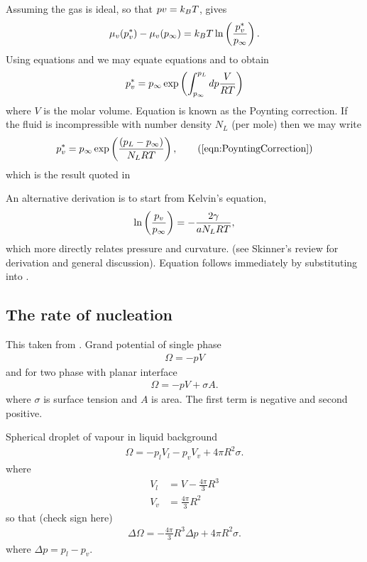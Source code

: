 Assuming the gas is ideal, so that $ p v = k_B T$,  gives
\begin{align}
  \mu_v(p_v^\ast) - \mu_v(p_{\infty}) = k_B T \ln \left( \frac{p_v^\ast}{p_\infty} \right).
\end{align}
Using equations  and  we may
equate equations  and  to obtain
\begin{align}
  p_v^\ast = p_\infty \exp \left( \int_{p_\infty}^{p_L} dp\frac{V}{RT}   \right)\label{eqn:PoyntingCorrectionFormal}
\end{align}
where $V$ is the molar volume.
Equation  is known as the Poynting correction.
If the fluid is incompressible with number density $N_L$  (per mole) then we may write
\begin{align}
  p_v^\ast = p_\infty \exp \lr{ \frac{\lr{p_L -p_\infty} }{N_L RT}  },\tag{\ref{eqn:PoyntingCorrection}}
\end{align}
which is the result quoted in 

An alternative derivation is to start  from Kelvin's equation,
\begin{align}
\ln\left( \frac{p_v}{p_\infty} \right) = - \frac{2\gamma }{a N_L RT}, \label{eqn:KelvinRelation}
\end{align}
which more directly relates pressure and curvature. (see Skinner's review\cite{Skinner1972} for derivation and general discussion).
Equation  follows immediately by substituting   into .

\subsection{The rate of nucleation}



This taken from \cite{Oxtoby1992}.
Grand potential of single phase
\begin{align}
  \Omega = - pV
\end{align}
and for two phase with planar interface
\begin{align}
  \Omega = -pV + \sigma A.
\end{align}
where $\sigma$ is surface tension and $A$ is area.
The first term is negative and second positive.

Spherical droplet of vapour in liquid background
\begin{align}
  \Omega  = -p_l V_l  - p_vV_v + 4\pi R^2 \sigma.
\end{align}
where
\begin{align}
  V_l &= V-\frac{4\pi}{3}R^3 \\
  V_v &= \frac{4\pi}{3}R^2
\end{align}
so that (check sign here)
\begin{align}
  \Delta \Omega = -  \frac{4\pi}{3} R^3 \Delta p + 4\pi R^2 \sigma.
\end{align}
where $\Delta p = p_l - p_v$.

